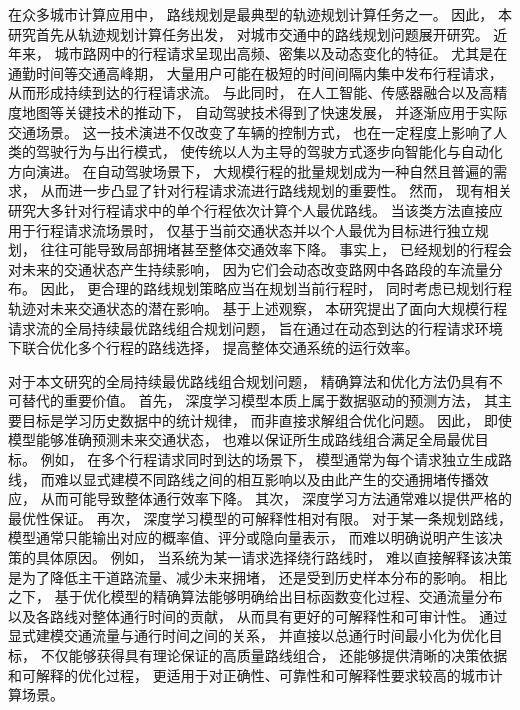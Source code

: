 在众多城市计算应用中， 路线规划是最典型的轨迹规划计算任务之一。 因此， 本研究首先从轨迹规划计算任务出发， 对城市交通中的路线规划问题展开研究。 近年来， 城市路网中的行程请求呈现出高频、密集以及动态变化的特征。 尤其是在通勤时间等交通高峰期， 大量用户可能在极短的时间间隔内集中发布行程请求， 从而形成持续到达的行程请求流。 与此同时， 在人工智能、传感器融合以及高精度地图等关键技术的推动下， 自动驾驶技术得到了快速发展， 并逐渐应用于实际交通场景。 这一技术演进不仅改变了车辆的控制方式， 也在一定程度上影响了人类的驾驶行为与出行模式， 使传统以人为主导的驾驶方式逐步向智能化与自动化方向演进。 在自动驾驶场景下， 大规模行程的批量规划成为一种自然且普遍的需求， 从而进一步凸显了针对行程请求流进行路线规划的重要性。 然而， 现有相关研究大多针对行程请求中的单个行程依次计算个人最优路线。 当该类方法直接应用于行程请求流场景时， 仅基于当前交通状态并以个人最优为目标进行独立规划， 往往可能导致局部拥堵甚至整体交通效率下降。 事实上， 已经规划的行程会对未来的交通状态产生持续影响， 因为它们会动态改变路网中各路段的车流量分布。 因此， 更合理的路线规划策略应当在规划当前行程时， 同时考虑已规划行程轨迹对未来交通状态的潜在影响。 基于上述观察， 本研究提出了面向大规模行程请求流的全局持续最优路线组合规划问题， 旨在通过在动态到达的行程请求环境下联合优化多个行程的路线选择， 提高整体交通系统的运行效率。

对于本文研究的全局持续最优路线组合规划问题， 精确算法和优化方法仍具有不可替代的重要价值。 首先， 深度学习模型本质上属于数据驱动的预测方法， 其主要目标是学习历史数据中的统计规律， 而非直接求解组合优化问题。 因此， 即使模型能够准确预测未来交通状态， 也难以保证所生成路线组合满足全局最优目标。 例如， 在多个行程请求同时到达的场景下， 模型通常为每个请求独立生成路线， 而难以显式建模不同路线之间的相互影响以及由此产生的交通拥堵传播效应， 从而可能导致整体通行效率下降。 其次， 深度学习方法通常难以提供严格的最优性保证。 再次， 深度学习模型的可解释性相对有限。 对于某一条规划路线， 模型通常只能输出对应的概率值、评分或隐向量表示， 而难以明确说明产生该决策的具体原因。 例如， 当系统为某一请求选择绕行路线时， 难以直接解释该决策是为了降低主干道路流量、减少未来拥堵， 还是受到历史样本分布的影响。 相比之下， 基于优化模型的精确算法能够明确给出目标函数变化过程、交通流量分布以及各路线对整体通行时间的贡献， 从而具有更好的可解释性和可审计性。 通过显式建模交通流量与通行时间之间的关系， 并直接以总通行时间最小化为优化目标， 不仅能够获得具有理论保证的高质量路线组合， 还能够提供清晰的决策依据和可解释的优化过程， 更适用于对正确性、可靠性和可解释性要求较高的城市计算场景。

